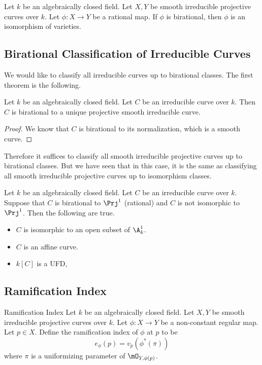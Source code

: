 \documentclass[a4paper]{article}
\begin{document}
\begin{prp}{}{} Let $k$ be an algebraically closed field. Let $X,Y$ be smooth irreducible projective curves over $k$. Let $\phi:X\to Y$ be a rational map. If $\phi$ is birational, then $\phi$ is an isomorphism of varieties. 
\end{prp}

\subsection{Birational Classification of Irreducible Curves}
We would like to classify all irreducible curves up to birational classes. The first theorem is the following. 

\begin{thm}{}{} Let $k$ be an algebraically closed field. Let $C$ be an irreducible curve over $k$. Then $C$ is birational to a unique projective smooth irreducible curve. 
\begin{proof}
We know that $C$ is birational to its normalization, which is a smooth curve. 
\end{proof}
\end{thm}

Therefore it suffices to classify all smooth irreducible projective curves up to birational classes. But we have seen that in this case, it is the same as classifying all smooth irreducible projective curves up to isomorphism classes. 

\begin{prp}{}{} Let $k$ be an algebraically closed field. Let $C$ be an irreducible curve over $k$. Suppose that $C$ is birational to $\Prj^1$ (rational) and $C$ is not isomorphic to $\Prj^1$. Then the following are true. 
\begin{itemize}
\item $C$ is isomorphic to an open subset of $\A_k^1$. 
\item $C$ is an affine curve. 
\item $k[C]$ is a UFD, 
\end{itemize}
\end{prp}


\subsection{Ramification Index}
\begin{defn}{Ramification Index}{} Let $k$ be an algebraically closed field. Let $X,Y$ be smooth irreducible projective curves over $k$. Let $\phi:X\to Y$ be a non-constant regular map. Let $p\in X$. Define the ramification index of $\phi$ at $p$ to be $$e_\phi(p)=v_p(\phi^\ast(\pi))$$ where $\pi$ is a uniformizing parameter of $\mO_{Y,\phi(p)}$. 
\end{defn}
\end{document}

